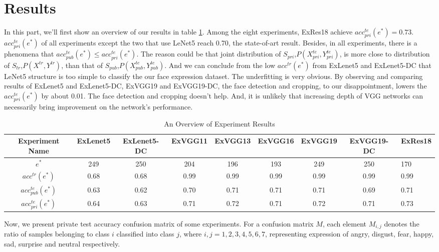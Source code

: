 \documentclass[journal, onecolumn]{IEEEtran}
\begin{document}
\section{Results}
In this part, we'll first show an overview of our results in table \ref{tab:Result-overview}. Among the eight experiments, ExRes18 achieve $acc^{te}_{pri}(e^*)=0.73$. $acc^{te}_{pri}(e^*)$ of all experiments except the two that use LeNet5 reach 0.70, the state-of-art result. Besides, in all experiments, there is a phenomena that $acc^{te}_{pub}(e^*) \leq acc^{te}_{pri}(e^*)$. The reason could be that joint distribution of $S_{pri}$,$P(X^{te}_{pri}, Y^{te}_{pri})$, is more close to distribution of $S_{tr}$,$P(X^{tr}, Y^{tr})$, than that of $S_{pub}$,$P(X^{te}_{pub}, Y^{te}_{pub})$. And we can conclude from the low $acc^{tr}(e^*)$ from ExLenet5 and ExLenet5-DC that LeNet5 structure is too simple to classify the our face expression dataset. The underfitting is very obvious. By observing and comparing results of ExLenet5 and ExLenet5-DC, ExVGG19 and ExVGG19-DC, the face detection and cropping, to our disappointment, lowers the $acc^{te}_{pri}(e^*)$ by about 0.01. The face detection and cropping doesn't help. And, it is unlikely that increasing depth of VGG networks can necessarily bring improvement on the network's performance.
\begin{table}
\caption{An Overview of Experiment Results}
\label{tab:Result-overview}
\begin{center}
\begin{tabular}{|c|c|c|c|c|c|c|c| p{1.5cm}|}
\hline
Experiment Name & ExLenet5 & ExLenet5-DC & ExVGG11 & ExVGG13 & ExVGG16 & ExVGG19 & ExVGG19-DC & ExRes18    \\ \hline
$e^*$  & 249 & 250 & 204 & 196 & 193 & 249 & 250 & 170  \\ \hline
$acc^{tr}(e^*)$    & 0.68 & 0.68 & 0.99 & 0.99 & 0.99 & 0.99 & 0.99 & 0.99  \\ \hline
$acc^{te}_{pub}(e^*)$    & 0.63 & 0.62 & 0.70 & 0.71 & 0.71 & 0.71 & 0.69 & 0.71  \\ \hline
$acc^{te}_{pri}(e^*)$    & 0.64 & 0.63 & 0.71 & 0.72 & 0.71 & 0.72 & 0.71 & 0.73  \\ \hline
\end{tabular}
\end{center}
\end{table}


Now, we present private test accuracy confusion matrix of some experiments. For a confusion matrix $M$, each element $M_{i,j}$ denotes the ratio of samples belonging to class $i$ classified into class $j$, where $i,j=1,2,3,4,5,6,7$, representing expression of angry, disgust, fear, happy, sad, surprise and neutral respectively.
\end{document}
